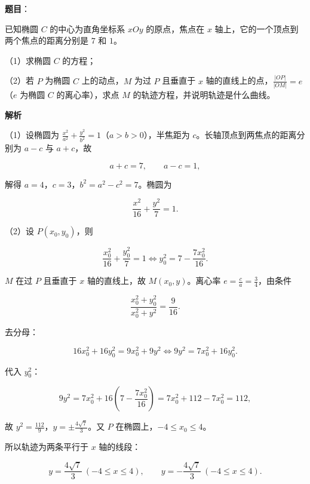 \begin{answer}

\textbf{题目}：

已知椭圆 $C$ 的中心为直角坐标系 $xOy$ 的原点，焦点在 $x$ 轴上，它的一个顶点到两个焦点的距离分别是 $7$ 和 $1$。

（1）求椭圆 $C$ 的方程；

（2）若 $P$ 为椭圆 $C$ 上的动点，$M$ 为过 $P$ 且垂直于 $x$ 轴的直线上的点，$\frac{|OP|}{|OM|}=e$（$e$ 为椭圆 $C$ 的离心率），求点 $M$ 的轨迹方程，并说明轨迹是什么曲线。

\textbf{解析}

（1）设椭圆为 $\frac{x^2}{a^2}+\frac{y^2}{b^2}=1$（$a>b>0$），半焦距为 $c$。长轴顶点到两焦点的距离分别为 $a-c$ 与 $a+c$，故

\nopagebreak[4]
\[a+c=7,\qquad a-c=1,\]

解得 $a=4$，$c=3$，$b^2=a^2-c^2=7$。椭圆为

\nopagebreak[4]
\[\frac{x^2}{16}+\frac{y^2}{7}=1 .\]

（2）设 $P(x_0,y_0)$，则

\nopagebreak[4]
\[\frac{x_0^2}{16}+\frac{y_0^2}{7}=1\iff y_0^2=7-\frac{7x_0^2}{16}.\]

$M$ 在过 $P$ 且垂直于 $x$ 轴的直线上，故 $M(x_0,y)$。离心率 $e=\frac ca=\frac34$，由条件

\nopagebreak[4]
\[\frac{x_0^2+y_0^2}{x_0^2+y^2}=\frac9{16}.\]

去分母：

\nopagebreak[4]
\[16x_0^2+16y_0^2=9x_0^2+9y^2\iff 9y^2=7x_0^2+16y_0^2 .\]

代入 $y_0^2$：

\nopagebreak[4]
\[9y^2=7x_0^2+16\left(7-\frac{7x_0^2}{16}\right)=7x_0^2+112-7x_0^2=112,\]

故 $y^2=\frac{112}{9}$，$y=\pm\frac{4\sqrt7}{3}$。又 $P$ 在椭圆上，$-4\leqslant x_0\leqslant4$。

所以轨迹为两条平行于 $x$ 轴的线段：

\nopagebreak[4]
\[y=\frac{4\sqrt7}{3}\ (-4\leqslant x\leqslant4),\qquad y=-\frac{4\sqrt7}{3}\ (-4\leqslant x\leqslant4).\]


\end{answer}
